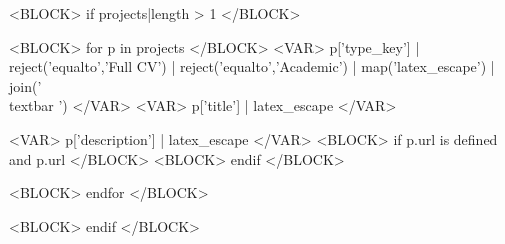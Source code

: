 <BLOCK> if projects|length > 1 </BLOCK>


\begin{cventries}
<BLOCK> for p in projects </BLOCK>
  \cventry
    {<VAR>
      p['type_key']
      | reject('equalto','Full CV')
      | reject('equalto','Academic')
      | map('latex_escape')
      | join(' {\\textbar} ')
    </VAR>}
    {<VAR> p['title'] | latex_escape </VAR>}
    {}
    {}
    {
      \begin{cvitems}
        \item {%
          <VAR> p['description'] | latex_escape </VAR>%
          <BLOCK> if p.url is defined and p.url </BLOCK>%
            \enskip\href{\detokenize{<VAR> p.url </VAR>}}{\honorlocationstyle{[LINK]}}%
          <BLOCK> endif </BLOCK>%
        }
      \end{cvitems}
    }
<BLOCK> endfor </BLOCK>
\end{cventries}
<BLOCK> endif </BLOCK>
